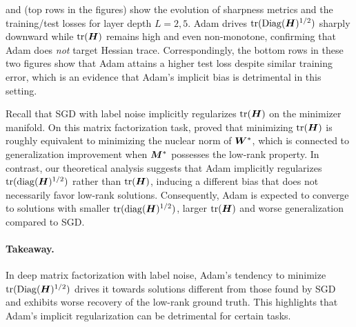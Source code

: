  and  (top rows in the figures) show the evolution of sharpness metrics and the training/test losses for layer depth $L=2,5$.  
Adam drives \(\text{tr}(\mathrm{Diag}({\bm{H}})^{1/2})\) sharply downward while \(\text{tr}({\bm{H}})\) remains high and even non-monotone, confirming that Adam does \emph{not} target Hessian trace.  
Correspondingly, the bottom rows in these two figures show that Adam attains a higher test loss despite similar training error, which is an evidence that Adam's implicit bias is detrimental in this setting.

Recall that SGD with label noise implicitly regularizes $\mathrm{tr}({\bm{H}})$ on the minimizer manifold. On this matrix factorization task, \citet{gatmiry2023inductive} proved that minimizing $\mathrm{tr}({\bm{H}})$ is roughly equivalent to minimizing the nuclear norm of ${\bm{W}}^*$, which is connected to generalization improvement when ${\bm{M}}^*$ possesses the low-rank property. In contrast, our theoretical analysis suggests that Adam implicitly regularizes $\mathrm{tr}(\mathrm{diag}({\bm{H}})^{1/2})$ rather than $\mathrm{tr}({\bm{H}})$, inducing a different bias that does not necessarily favor low-rank solutions. Consequently, Adam is expected to converge to solutions with smaller $\mathrm{tr}(\mathrm{diag}({\bm{H}})^{1/2})$, larger $\mathrm{tr}({\bm{H}})$ and worse generalization compared to SGD. 

\paragraph{Takeaway.}
In deep matrix factorization with label noise, Adam’s tendency to minimize $\text{tr}(\mathrm{Diag}({\bm{H}})^{1/2})$ drives it towards solutions different from those found by SGD and exhibits worse recovery of the low-rank ground truth. This highlights that Adam's implicit regularization can be detrimental for  certain tasks.

